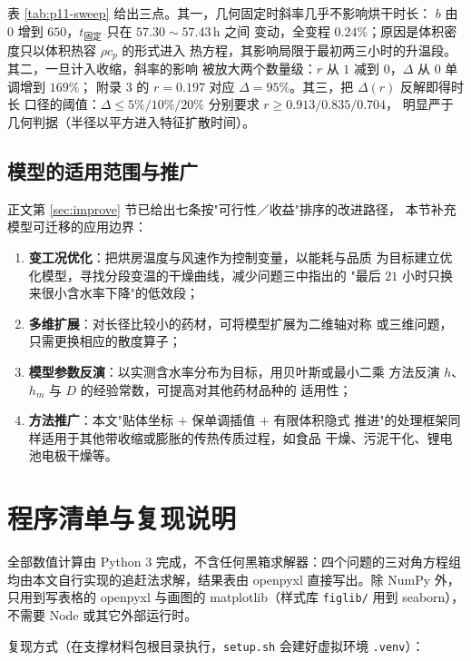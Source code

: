 \documentclass[12pt,a4paper,fontset=none]{ctexart}
\begin{document}
表 \ref{tab:p11-sweep} 给出三点。其一，几何固定时斜率几乎不影响烘干时长：
$b$ 由 $0$ 增到 $650$，$t_{\text{固定}}$ 只在 $57.30\sim57.43$\,h 之间
变动，全变程 $0.24\%$；原因是体积密度只以体积热容 $\rho c_p$ 的形式进入
热方程，其影响局限于最初两三小时的升温段。其二，一旦计入收缩，斜率的影响
被放大两个数量级：$r$ 从 $1$ 减到 $0$，$\Delta$ 从 $0$ 单调增到 $169\%$；
附录 3 的 $r=0.197$ 对应 $\Delta=95\%$。其三，把 $\Delta(r)$ 反解即得时长
口径的阈值：$\Delta\le5\%/10\%/20\%$ 分别要求 $r\ge0.913/0.835/0.704$，
明显严于几何判据（半径以平方进入特征扩散时间）。

\subsection{模型的适用范围与推广}
\label{app:promotion}

正文第 \ref{sec:improve} 节已给出七条按"可行性／收益"排序的改进路径，
本节补充模型可迁移的应用边界：

\begin{enumerate}
  \item \textbf{变工况优化}：把烘房温度与风速作为控制变量，以能耗与品质
        为目标建立优化模型，寻找分段变温的干燥曲线，减少问题三中指出的
        "最后 $21$ 小时只换来很小含水率下降"的低效段；
  \item \textbf{多维扩展}：对长径比较小的药材，可将模型扩展为二维轴对称
        或三维问题，只需更换相应的散度算子；
  \item \textbf{模型参数反演}：以实测含水率分布为目标，用贝叶斯或最小二乘
        方法反演 $h$、$h_m$ 与 $D$ 的经验常数，可提高对其他药材品种的
        适用性；
  \item \textbf{方法推广}：本文"贴体坐标 $+$ 保单调插值 $+$ 有限体积隐式
        推进"的处理框架同样适用于其他带收缩或膨胀的传热传质过程，如食品
        干燥、污泥干化、锂电池电极干燥等。
\end{enumerate}

\section{程序清单与复现说明}

全部数值计算由 Python 3 完成，不含任何黑箱求解器：四个问题的三对角方程组
均由本文自行实现的追赶法求解，结果表由 openpyxl 直接写出。除 NumPy 外，
只用到写表格的 openpyxl 与画图的 matplotlib（样式库 \texttt{figlib/} 用到
seaborn），不需要 Node 或其它外部运行时。

复现方式（在支撑材料包根目录执行，\texttt{setup.sh} 会建好虚拟环境
\texttt{.venv}）：
\end{document}

